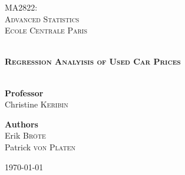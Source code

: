 \begin{titlepage}
\begin{center}


\hfill

\vfill 

\textsc{\Large MA2822:}\\ \textsc{\Large Advanced Statistics}\\[0.5cm]
\textsc{\Large Ecole Centrale Paris}\\[0.5cm]

\vfill

\HRule \\[0.4cm]
{ \LARGE \bfseries \textsc{Regression Analyisis of Used Car Prices}\\[0.4cm] }
\HRule \\[1.5cm]


\vfill

{\large
\begin{center}
  \textbf{Professor}\\[0.1cm]
  Christine \textsc{Keribin}
\end{center}
\vfill
\begin{center}
  \textbf{Authors}\\[0.1cm]
  Erik \textsc{Bröte}\\[0.1cm]
  Patrick \textsc{von Platen}
\end{center}
}

\vfill

{\large \today}

\end{center}
\end{titlepage}